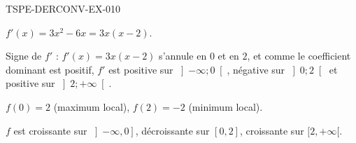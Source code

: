 \begin{corrige}{TSPE-DERCONV-EX-010}


$f'(x) = 3x^2 - 6x = 3x(x - 2)$.

Signe de $f'$ : $f'(x)=3x(x-2)$ s'annule en $0$ et en $2$, et comme le
coefficient dominant est positif, $f'$ est positive sur
$\left]-\infty;0\right[$, négative sur $\left]0;2\right[$ et positive sur
$\left]2;+\infty\right[$.

$f(0) = 2$ (maximum local), $f(2) = -2$ (minimum local).

$f$ est croissante sur $\left]-\infty, 0\right]$, décroissante sur $[0, 2]$, croissante sur $[2, +\infty[$.

\end{corrige}
